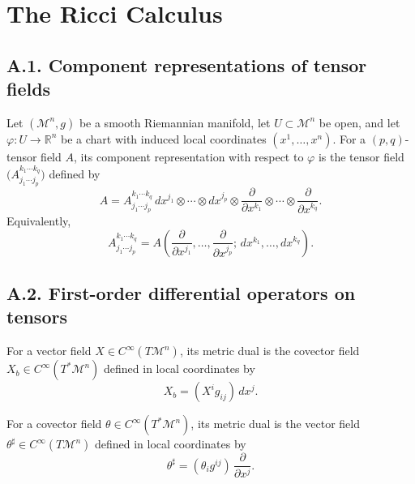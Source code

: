 \chapter{The Ricci Calculus}

\section*{A.1. Component representations of tensor fields}

\begin{definition}
\label{appa-def-component-representation}
Let \((\mathcal M^n,g)\) be a smooth Riemannian manifold, let \(U\subset \mathcal M^n\) be open, and let \(\varphi:U\to \mathbb R^n\) be a chart with induced local coordinates \((x^1,\ldots,x^n)\). For a \((p,q)\)-tensor field \(A\), its component representation with respect to \(\varphi\) is the tensor field \(\bigl(A^{k_1\cdots k_q}_{j_1\cdots j_p}\bigr)\) defined by
\[
A = A^{k_1\cdots k_q}_{j_1\cdots j_p}\, dx^{j_1}\otimes \cdots \otimes dx^{j_p}\otimes \frac{\partial}{\partial x^{k_1}}\otimes \cdots \otimes \frac{\partial}{\partial x^{k_q}}.
\]
Equivalently,
\[
A^{k_1\cdots k_q}_{j_1\cdots j_p}
=
A\!\left(
\frac{\partial}{\partial x^{j_1}},\ldots,\frac{\partial}{\partial x^{j_p}};\,
dx^{k_1},\ldots,dx^{k_q}
\right).
\]
\end{definition}

\section*{A.2. First-order differential operators on tensors}

\begin{definition}
\label{appa-def-metric-dual-vector}
For a vector field \(X\in C^\infty(T\mathcal M^n)\), its metric dual is the covector field \(X_b\in C^\infty(T^*\mathcal M^n)\) defined in local coordinates by
\[
X_b=(X^i g_{ij})\,dx^j.
\]
\end{definition}

\begin{definition}
\label{appa-def-metric-dual-covector}
For a covector field \(\theta\in C^\infty(T^*\mathcal M^n)\), its metric dual is the vector field \(\theta^\sharp\in C^\infty(T\mathcal M^n)\) defined in local coordinates by
\[
\theta^\sharp = (\theta_i g^{ij})\,\frac{\partial}{\partial x^j}.
\]
\end{definition}

